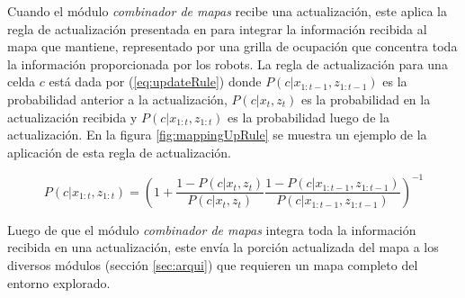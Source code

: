 




Cuando el módulo \emph{combinador de mapas} recibe una actualización, este
aplica la regla de actualización presentada en \cite{stachniss2009robotic} para
integrar la información recibida al mapa que mantiene, representado por una
grilla de ocupación que concentra toda la información proporcionada por los
robots. La regla de actualización para una celda $c$ está dada por
(\ref{eq:updateRule}) donde $P(c|x_{1:t-1},z_{1:t-1})$ es la probabilidad
anterior a la actualización, $P(c | x_t,z_t)$ es la probabilidad en la
actualización recibida y  $P(c|x_{1:t},z_{1:t})$ es la probabilidad luego de la
actualización. En la figura \ref{fig:mappingUpRule} se muestra un ejemplo de la
aplicación de esta regla de actualización. 

\begin{equation}
  P(c|x_{1:t},z_{1:t}) =\left( 1 + \frac{1 - P(c | x_t,z_t)}{P(c|x_t,z_t)} \frac{1 - P(c|x_{1:t-1},z_{1:t-1})}{P(c|x_{1:t-1},z_{1:t-1})} \right)^{-1}
\label{eq:updateRule}
\end{equation}


Luego de que el módulo \emph{combinador de mapas} integra toda la información
recibida en una actualización, este envía la porción actualizada del mapa a los
diversos módulos (sección \ref{sec:arqui}) que requieren un mapa
completo del entorno explorado.

